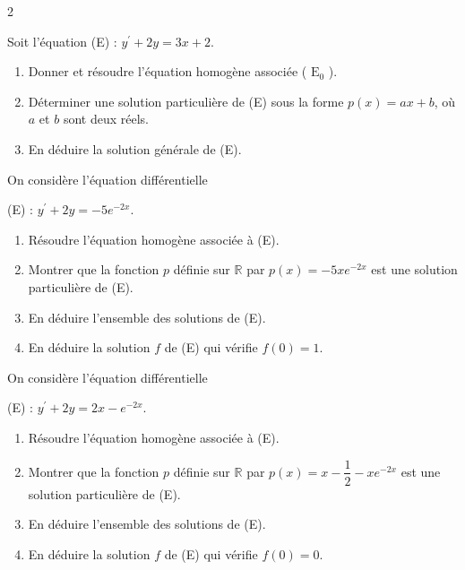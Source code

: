 \begin{multicols}{2}
\begin{exercice_cours}[\quad]{}
			Soit l'équation (E) : $y^{\prime}+2 y=3 x+2$.

\begin{enumerate}
  \item Donner et résoudre l'équation homogène associée ( $\mathrm{E}_{0}$ ).
  \item Déterminer une solution particulière de (E) sous la forme $p(x)=a x+b$, où $a$ et $b$ sont deux réels.
  \item En déduire la solution générale de (E).
\end{enumerate}

\end{exercice_cours}



\begin{exercice_cours}[\quad]{}
On considère l'équation différentielle 

(E) : $y^{\prime}+2 y=-5 e^{-2 x}$.

\begin{enumerate}
  \item Résoudre l'équation homogène associée à (E).
  \item Montrer que la fonction $p$ définie sur $\mathbb{R}$ par $p(x)=-5 x e^{-2 x}$ est une solution particulière de (E).
  \item En déduire l'ensemble des solutions de (E).
  \item En déduire la solution $f$ de (E) qui vérifie $f(0)=1$.
\end{enumerate}

\end{exercice_cours}


		\begin{exercice_cours}[\quad]{}

			On considère l'équation différentielle 
			
			(E) : $y^{\prime}+2 y=2 x-e^{-2 x}$.

\begin{enumerate}
  \item Résoudre l'équation homogène associée à (E).
  \item Montrer que la fonction $p$ définie sur $\mathbb{R}$ par $p(x)=x-\dfrac{1}{2}-x e^{-2 x}$ est une solution particulière de (E).
  \item En déduire l'ensemble des solutions de (E).
  \item En déduire la solution $f$ de (E) qui vérifie $f(0)=0$.
\end{enumerate}


\end{exercice_cours}


\end{multicols}